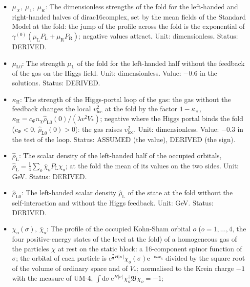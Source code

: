 \documentclass[
  10pt,
]{article}
\providecommand{\tightlist}{%
  \setlength{\itemsep}{0pt}\setlength{\parskip}{0pt}}
\begin{document}
\begin{itemize}
\tightlist
\item
  \(\mu_X,\ \mu_{\mathrm{L}},\ \mu_{\mathrm{R}}\): The dimensionless
  strengths of the fold for the left-handed and right-handed halves of
  dirac16complex, set by the mean fields of the Standard Model at the
  fold: the jump of the profile across the fold is the exponential of
  \(\gamma^{(0)}(\mu_{\mathrm{L}}P_{\mathrm{L}} + \mu_{\mathrm{R}}P_{\mathrm{R}})\);
  negative values attract. Unit: dimensionless. Status: DERIVED.
\item
  \(\mu_{\mathrm{L}0}\): The strength \(\mu_{\mathrm{L}}\) of the fold
  for the left-handed half without the feedback of the gas on the Higgs
  field. Unit: dimensionless. Value: \(-0.6\) in the solutions. Status:
  DERIVED.
\item
  \(\kappa_{\mathrm{H}}\): The strength of the Higgs-portal loop of the
  gas: the gas without the feedback changes the local
  \(v_{\mathrm{loc}}^2\) at the fold by the factor
  \(1 - \kappa_{\mathrm{H}}\),
  \(\kappa_{\mathrm{H}} = c_\Phi n_\chi\hat\rho_{\mathrm{L}0}(0)/(\lambda v^2V_*)\);
  negative where the Higgs portal binds the fold (\(c_\Phi < 0\),
  \(\hat\rho_{\mathrm{L}0}(0) > 0\)): the gas raises
  \(v_{\mathrm{loc}}^2\). Unit: dimensionless. Value: \(-0.3\) in the
  test of the loop. Status: ASSUMED (the value), DERIVED (the sign).
\item
  \(\hat\rho_{\mathrm{L}}\): The scalar density of the left-handed half
  of the occupied orbitals,
  \(\hat\rho_{\mathrm{L}} = \frac14\sum_o\bar\chi_oP_{\mathrm{L}}\chi_o\);
  at the fold the mean of its values on the two sides. Unit: GeV.
  Status: DERIVED.
\item
  \(\hat\rho_{\mathrm{L}0}\): The left-handed scalar density
  \(\hat\rho_{\mathrm{L}}\) of the state at the fold without the
  self-interaction and without the Higgs feedback. Unit: GeV. Status:
  DERIVED.
\item
  \(\chi_o(\sigma),\ \bar\chi_o\): The profile of the occupied Kohn-Sham
  orbital \(o\) (\(o = 1, \dots, 4\), the four positive-energy states of
  the level at the fold) of a homogeneous gas of the particles \(\chi\)
  at rest on the static block: a 16-component spinor function of
  \(\sigma\); the orbital of each particle is
  \(\mathrm{e}^{\frac72H\lvert\sigma\rvert}\chi_o(\sigma)\mathrm{e}^{-\mathrm{i}\omega x_4}\)
  divided by the square root of the volume of ordinary space and of
  \(V_*\); normalised to the Krein charge \(-1\) with the measure of
  UM-4,
  \(\int\mathrm{d}\sigma\,\mathrm{e}^{H\lvert\sigma\rvert}\chi_o^\dagger\mathfrak{B}\chi_o = -1\);

\end{itemize}
\end{document}
